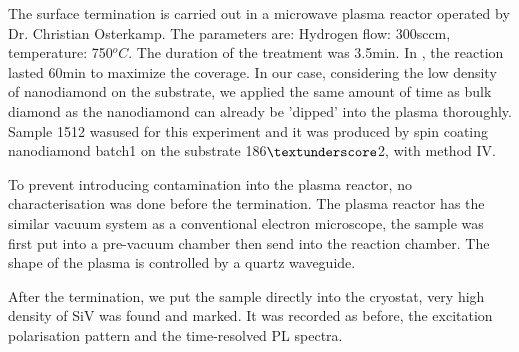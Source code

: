 The surface termination is carried out in a microwave plasma reactor operated by Dr. Christian Osterkamp. The parameters are: Hydrogen flow: 300sccm, temperature: 750$^{o}C$. The duration of the treatment was 3.5min. In \citep{yeap_detonation_2009}, the reaction lasted 60min to maximize the coverage. In our case, considering the low density of nanodiamond on the substrate, we applied the same amount of time as bulk diamond as the nanodiamond can already be 'dipped' into the plasma thoroughly. Sample 1512 wasused for this experiment and it was produced by spin coating nanodiamond batch1 on the substrate 186$\textunderscore$2, with method IV.

To prevent introducing contamination into the plasma reactor, no characterisation was done before the termination. The plasma reactor has the similar vacuum system as a conventional electron microscope, the sample was first put into a pre-vacuum chamber then send into the reaction chamber. The shape of the plasma is controlled by a quartz waveguide. 

After the termination, we put the sample directly into the cryostat, very high density of SiV was found and marked. It was recorded as before, the excitation polarisation pattern and the time-resolved PL spectra.

